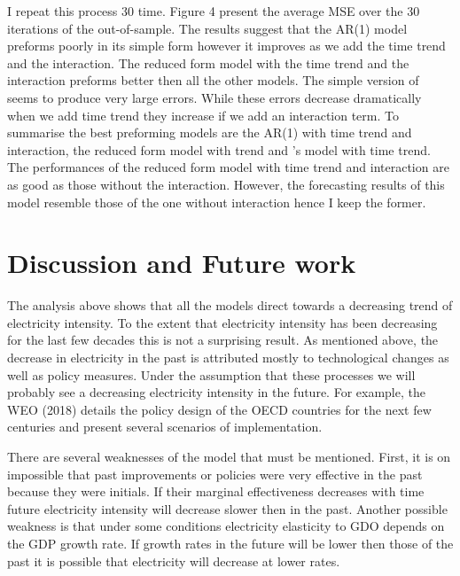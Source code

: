 \documentclass[]{amsart}
\begin{document}
\bigskip

I repeat this process 30 time. Figure 4 present the average MSE over the 30 iterations of the out-of-sample. The results suggest that the AR(1) model preforms poorly in its simple form however it improves as we add the time trend and the interaction. The reduced form model with the time trend and the interaction preforms better then all the other models. The simple version of \cite{barro1992convergence} seems to produce very large errors. While these errors decrease dramatically when we add time trend they increase if we add an interaction term. To summarise the best preforming models are the AR(1) with time trend and interaction, the reduced form model with trend and \cite{barro1992convergence}'s model with time trend. The performances of the reduced form model with time trend and interaction are as good as those without the interaction. However, the forecasting results of this model resemble those of the one without interaction hence I keep the former. 

\bigskip

\section{Discussion and Future work}

The analysis above shows that all the models direct towards a decreasing trend of electricity intensity. To the extent that electricity intensity has been decreasing for the last few decades this is not a surprising result. As mentioned above, the decrease in electricity in the past is attributed mostly to  technological changes as well as policy measures. Under the assumption that these processes we will probably see a decreasing electricity intensity in the future.  For example, the WEO (2018) details the policy design of the OECD countries for the next few centuries and present several scenarios of implementation.   

\bigskip

There are several weaknesses of the model that must be mentioned. First, it is on impossible that past improvements or policies were very effective in the past because they were initials. If their marginal effectiveness decreases with time future electricity intensity will decrease slower then in the past. Another possible weakness is that under some conditions electricity elasticity to GDO depends on the GDP growth rate. If growth rates in the future will be lower then those of the past it is possible that electricity will decrease at lower rates.
\end{document}
